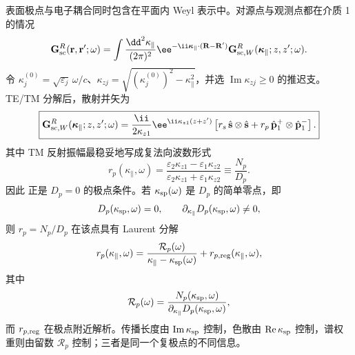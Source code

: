表面极点与电子耦合同时包含在平面内 Weyl 表示中。对源点与观测点都在介质 1 的情况
\begin{equation}
\mathbf G_{\rm sc}^R(\mathbf r,\mathbf r';\omega)
=\int\frac{\dd^2 \kappa_\parallel}{(2\pi)^2}
 \ee^{-\ii\boldsymbol\kappa_\parallel\cdot(\mathbf R-\mathbf R')}
\mathbf G_{{\rm sc},W}^R(\boldsymbol\kappa_\parallel;z,z';\omega).
\label{eq:planar_green_weyl_definition}
\end{equation}
令 $\kappa_j^{(0)}=\sqrt{\varepsilon_j}\,\omega/c$、$\kappa_{zj}=\sqrt{(\kappa_j^{(0)})^2-\kappa_\parallel^2}$，并选 $\operatorname{Im}\kappa_{zj}\ge0$ 的推迟支。TE/TM 分解后，散射并矢为
\begin{equation}
\boxed{
\mathbf G_{{\rm sc},W}^R
(\boldsymbol\kappa_\parallel;z,z';\omega)
=\frac{\ii}{2\kappa_{z1}}\ee^{\ii\kappa_{z1}(z+z')}
\left[r_s\,\hat{\mathbf s}\otimes\hat{\mathbf s}
+r_p\,\hat{\mathbf p}_1^+\otimes\hat{\mathbf p}_1^-\right].}
\label{eq:planar_scattering_green_dyadic}
\end{equation}
其中 TM 反射振幅最稳妥地写成复法向波数形式
\begin{equation}
r_p(\kappa_\parallel,\omega)
=\frac{\varepsilon_2\kappa_{z1}-\varepsilon_1\kappa_{z2}}
{\varepsilon_2\kappa_{z1}+\varepsilon_1\kappa_{z2}}
\equiv\frac{N_p}{D_p}.
\label{eq:rp_complex_kz_form}
\end{equation}
因此 正是 $D_p=0$ 的极点条件。若 $\kappa_{\rm sp}(\omega)$ 是 $D_p$ 的简单零点，即
\begin{equation*}
 D_p(\kappa_{\rm sp},\omega)=0,
 \qquad
 \partial_{\kappa_\parallel}D_p(\kappa_{\rm sp},\omega)\neq0,
\end{equation*}
则 $r_p=N_p/D_p$ 在该点具有 Laurent 分解
\begin{equation*}
 r_p(\kappa_\parallel,\omega)
 =\frac{\mathcal R_p(\omega)}
 {\kappa_\parallel-\kappa_{\rm sp}(\omega)}
 +r_{p,{\rm reg}}(\kappa_\parallel,\omega),
\end{equation*}
其中
\begin{equation*}
 \mathcal R_p(\omega)
 =\frac{N_p(\kappa_{\rm sp},\omega)}
 {\partial_{\kappa_\parallel}D_p(\kappa_{\rm sp},\omega)},
\end{equation*}
而 $r_{p,{\rm reg}}$ 在极点附近解析。传播长度由 $\operatorname{Im}\kappa_{\rm sp}$ 控制，色散由 $\operatorname{Re}\kappa_{\rm sp}$ 控制，谱权重则由留数 $\mathcal R_p$ 控制；三者是同一个复极点的不同信息。

